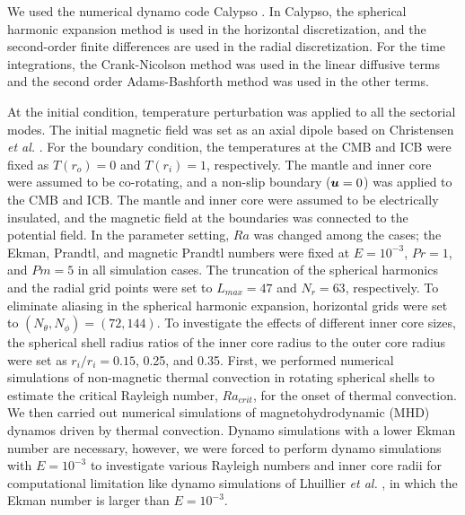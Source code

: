 We used the numerical dynamo code Calypso \cite{Matsui:2014}. 
In Calypso, the spherical harmonic expansion method is used in the horizontal discretization, and the second-order finite differences are used in the radial discretization. 
For the time integrations, the Crank-Nicolson method was used in the linear diffusive terms and the second order Adams-Bashforth method was used in the other terms.

At the initial condition, temperature perturbation was applied to all the sectorial modes. 
The initial magnetic field was set as an axial dipole based on Christensen {\it et al.} . 
For the boundary condition, the temperatures at the CMB and ICB were fixed as $T(r_{o}) = 0$ and  $T(r_{i}) = 1$, respectively. 
The mantle and inner core were assumed to be co-rotating, and a non-slip boundary ($\mbox{\boldmath$u$} = 0$) was applied to the CMB and ICB. 
The mantle and inner core were assumed to be electrically insulated, and the magnetic field at the boundaries was connected to the potential field.
In the parameter setting, $Ra$ was changed among the cases; the Ekman, Prandtl, and magnetic Prandtl numbers were fixed at $E = 10^{-3}$, $Pr = 1$, and $Pm = 5$ in all simulation cases. 
The truncation of the spherical harmonics and the radial grid points were set to $L_{max} = 47$ and $N_{r} = 63$, respectively. 
To eliminate aliasing in the spherical harmonic expansion, horizontal grids were set to $(N_{\theta}, N_{\phi}) = (72, 144)$. To investigate the effects of different inner core sizes, the spherical shell radius ratios of the inner core radius to the outer core radius were set as $r_{i} / r_{i} = 0.15$, 0.25, and 0.35. 
First, we performed numerical simulations of non-magnetic thermal convection in rotating spherical shells to estimate the critical Rayleigh number, $Ra_{crit}$, for the onset of thermal convection. 
We then carried out numerical simulations of magnetohydrodynamic (MHD) dynamos driven by thermal convection. 
{\color{red}
Dynamo simulations with a lower Ekman number are necessary, however, we were forced to perform dynamo simulations with $E = 10^{-3}$ to investigate various Rayleigh numbers and inner core radii for computational limitation like dynamo simulations of Lhuillier {\it et al.} , in which the Ekman number is larger than $E = 10^{-3}$.
}
